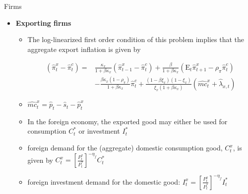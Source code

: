 \documentclass[9pt]{beamer}
\let\olditem\item
\renewcommand{\item}{%
\olditem\vspace{\fill}}
\begin{document}
\begin{frame}{Firms}
\begin{itemize}
    \item \textbf{Exporting firms} 
    \begin{itemize}
        \item The log-linearized first order condition of this problem implies that the aggregate export inflation is given by
        
$$\begin{aligned}
    \left(\widehat{\pi}_{t}^{x}-\widehat{\pi}_{t}^{c}\right)=& \frac{\kappa_{x}}{1+\beta \kappa_{x}}\left(\widehat{\pi}_{t-1}^{x}-\widehat{\pi}_{t}^{c}\right)+\frac{\beta}{1+\beta \kappa_{x}}\left(\mathrm{E}_{t} \widehat{\pi}_{t+1}^{x}-\rho_{\pi} \widehat{\pi}_{t}^{c}\right) \\
    &-\frac{\beta \kappa_{x}\left(1-\rho_{\pi}\right)}{1+\beta \kappa_{x}} \widehat{\pi}_{t}^{c}+\frac{\left(1-\beta \xi_{x}\right)\left(1-\xi_{x}\right)}{\xi_{x}\left(1+\beta \kappa_{x}\right)}\left(\widehat{m c}_{t}^{x}+\widehat{\lambda}_{x, t}\right)
\end{aligned}$$
    
    \item $\widehat{mc}_t^{x} = \widehat{p}_t - \widehat{s}_t - \widehat{p}_t^{x}$
    
    \item In the foreign economy, the exported good may either be used for consumption $C_t^{*}$ or investment $I_t^{*}$
    
    \item foreign demand for the (aggregate) domestic consumption good, $C_t^{x}$, is given by $C_{t}^{x}=\left[\frac{P_{t}^{x}}{P_{t}^{*}}\right]^{-\eta_{f}} C_{t}^{*}$
    
    \item foreign investment demand for the domestic good: $I_{t}^{x}=\left[\frac{P_{t}^{x}}{P_{t}^{*}}\right]^{-\eta_{f}} I_{t}^{*}$
    
\end{itemize}
\end{itemize}

\end{frame}
\end{document}
